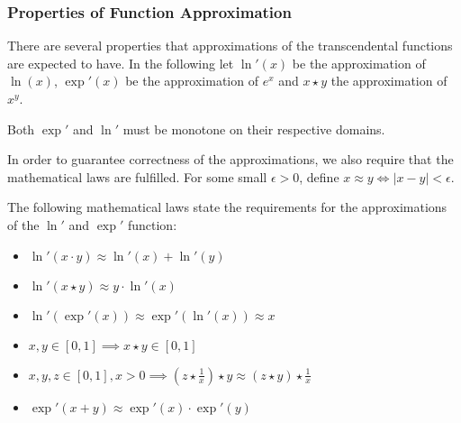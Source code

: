 \subsubsection{Properties of Function Approximation}
\label{sec:prop-funct-appr-1}

There are several properties that approximations of the transcendental functions
are expected to have. In the following let $\ln'(x)$ be the approximation of
$\ln(x)$, $\exp'(x)$ be the approximation of $e^{x}$ and $x\star y$ the approximation
of $x^{y}$.

\begin{property}
  \label{prop:monotone}
  Both $\exp'$ and $\ln'$ must be monotone on their respective domains.
\end{property}

In order to guarantee correctness of the approximations, we also require that
the mathematical laws are fulfilled. For some small $\epsilon > 0$, define
$x \approx y \Leftrightarrow \lvert x - y\rvert < \epsilon$.

\begin{property}
  \label{prop:ln-laws}
  The following mathematical laws state the requirements for the approximations
  of the $\ln'$ and $\exp'$ function:
  \begin{itemize}
  \item $\ln'(x\cdot y) \approx \ln'(x) + \ln'(y)$
  \item $\ln'(x\star y) \approx y\cdot \ln'(x)$
  \item $\ln'(\exp'(x)) \approx \exp'(\ln'(x)) \approx x$
  \item $x, y \in [0,1] \implies x \star y \in [0, 1]$
  \item $x, y, z \in [0,1], x > 0 \implies
    (z\star\frac{1}{x})\star y \approx (z\star y)\star\frac{1}{x}$
  \item $\exp'(x + y) \approx \exp'(x) \cdot \exp'(y)$
  \end{itemize}
\end{property}

